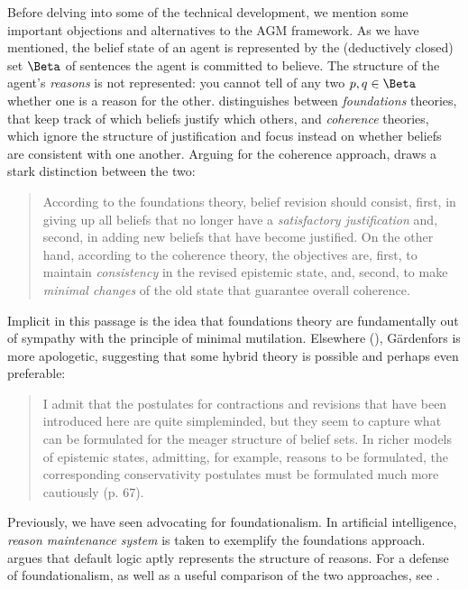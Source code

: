 Before delving into some of the technical development, we mention some important
objections and alternatives to the AGM framework. As we have mentioned, the
belief state of an agent is represented by the (deductively closed) set $\Beta$
of sentences the agent is committed to believe. The structure of the agent's {\em
reasons} is not represented: you cannot tell of any two $p,q\in \Beta$ whether
one is a reason for the other. \citet{gardenfors1992beliefrevision}
distinguishes between {\em foundations} theories, that keep track of which
beliefs justify which others, and {\em coherence} theories, which ignore the
structure of justification and focus instead on whether beliefs are consistent
with one another. Arguing for the coherence approach,
\citet{gardenfors1992beliefrevision} draws a stark distinction between the two:
\begin{quote}
According to the foundations theory, belief revision should consist, first, in
giving up all beliefs that no longer have a {\em satisfactory justification}
and, second, in adding new beliefs that have become justified. On the other
hand, according to the coherence theory, the objectives are, first, to maintain
{\em consistency} in the revised epistemic state, and, second, to make {\em
minimal changes} of the old state that guarantee overall coherence. 
\end{quote}
Implicit in this passage is the idea that foundations theory are fundamentally
out of sympathy with the principle of minimal mutilation. Elsewhere
(), G\"{a}rdenfors is more apologetic,
suggesting that some hybrid theory is possible and perhaps even preferable:
\begin{quote}
  I admit that the postulates for contractions and revisions that have been
  introduced here are quite simpleminded, but they seem to capture what can be
  formulated for the meager structure of belief sets. In richer models of
  epistemic states, admitting, for example, reasons to be formulated, the
  corresponding conservativity postulates must be formulated much more
  cautiously (p. 67).
\end{quote}
Previously, we have seen \citet{pollock1987defeasible} advocating for
foundationalism. In artificial intelligence, 
{\em reason maintenance system} is taken to exemplify the foundations approach.
\citet{horty2012reasons} argues that default logic aptly represents the
structure of reasons. For a defense of foundationalism, as well as a useful
comparison of the two approaches, see \citet{doyle1992reason}.

